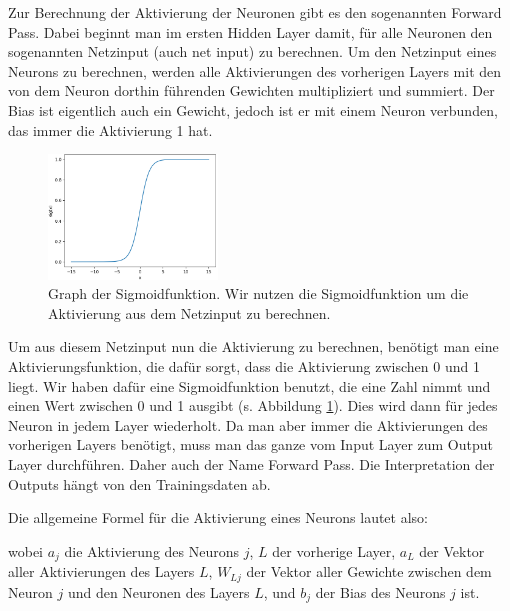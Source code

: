 \documentclass[11pt]{scrartcl}
\begin{document}

	Zur Berechnung der Aktivierung der Neuronen gibt es den sogenannten Forward Pass. Dabei beginnt man im ersten Hidden Layer damit, für alle Neuronen den sogenannten Netzinput (auch net input) zu berechnen. Um den Netzinput eines Neurons zu berechnen, werden alle Aktivierungen des vorherigen Layers mit den von dem Neuron dorthin führenden Gewichten multipliziert und summiert. Der Bias ist eigentlich auch ein Gewicht, jedoch ist er mit einem Neuron verbunden, das immer die Aktivierung 1 hat.

	\begin{figure}
		\centering
		\vspace*{-5mm}
		\includegraphics[width=0.4\textwidth]{pictures/sig_func.png}
		\caption{Graph der Sigmoidfunktion. Wir nutzen die Sigmoidfunktion um die Aktivierung aus dem Netzinput zu berechnen.}
		\label{sig_func}
	\end{figure}

	Um aus diesem Netzinput nun die Aktivierung zu berechnen, benötigt man eine Aktivierungsfunktion, die dafür sorgt, dass die Aktivierung zwischen 0 und 1 liegt. Wir haben dafür eine Sigmoidfunktion benutzt, die eine Zahl nimmt und einen Wert zwischen 0 und 1 ausgibt (s. Abbildung \ref{sig_func}). Dies wird dann für jedes Neuron in jedem Layer wiederholt. Da man aber immer die Aktivierungen des vorherigen Layers benötigt, muss man das ganze vom Input Layer zum Output Layer durchführen. Daher auch der Name Forward Pass. Die Interpretation der Outputs hängt von den Trainingsdaten ab.

	{\newpage
	
	Die allgemeine Formel für die Aktivierung eines Neurons lautet also:}


	\form{
	\[
		\sig(x)=\frac{1}{1+e^{-x}}
		\]
	\[
		a_{j} = \sig\left(\sum_{L} (a_{L} * W_{Lj}) + b_{j}\right)
		\]}
	
	\noindent wobei $a_j$ die Aktivierung des Neurons $j$, $L$ der vorherige Layer, $a_L$ der Vektor aller Aktivierungen des Layers $L$, $W_{Lj}$ der Vektor aller Gewichte zwischen dem Neuron $j$ und den Neuronen des Layers $L$, und $b_j$ der Bias des Neurons $j$ ist. \cite{brotcrunsher:forwardpass}	
	
\end{document}
